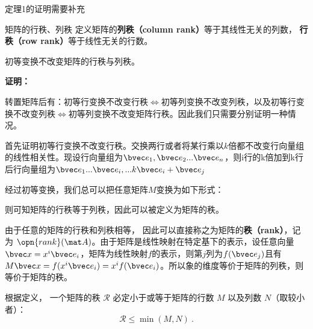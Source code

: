 
\begin{issues}
\issueDraft 定理1的证明需要补充
\end{issues}


\begin{definition}{矩阵的行秩、列秩}
定义矩阵的\textbf{列秩（column rank）}等于其线性无关的列数， \textbf{行秩（row rank）}等于线性无关的行数。
\end{definition}
\begin{theorem}{}
初等变换不改变矩阵的行秩与列秩。
\end{theorem}
\textbf{证明：}

转置矩阵后有：初等行变换不改变行秩$\Leftrightarrow$初等列变换不改变列秩，以及初等行变换不改变列秩$\Leftrightarrow$初等列变换不改变矩阵行秩。因此我们只需要分别证明一种情况。

首先证明初等行变换不改变行秩。交换两行或者将某行乘以$k$倍都不改变行向量组的线性相关性。现设行向量组为$\bvec e_1,\bvec e_2...\bvec e_n$，则i行的k倍加到k行后行向量组为$\bvec e_1...\bvec e_i,...k\bvec e_i+\bvec e_j$


经过初等变换，我们总可以把任意矩阵$M$变换为如下形式：


则可知矩阵的行秩等于列秩，因此可以被定义为矩阵的秩。

\begin{definition}{}
由于任意的矩阵的行秩和列秩相等， 因此可以直接称之为矩阵的\textbf{秩（rank）}，记为 $\opn{rank}(\mat A)$。由于矩阵是线性映射在特定基下的表示，设任意向量$\bvec x=x^i\bvec e_i$，矩阵为线性映射$f$的表示，则第$j$列为$f(\bvec e_j)$且有$M\bvec x=f(x^i\bvec  e_i)=x^if(\bvec e_i)$。所以象的维度等价于矩阵的列秩，则等价于矩阵的秩。
\end{definition}




\begin{theorem}{}
根据定义， 一个矩阵的秩 $\mathcal R$ 必定小于或等于矩阵的行数 $M$ 以及列数 $N$（取较小者）：
\begin{equation}
\mathcal R\leq \min (M, N)~.
\end{equation}
\end{theorem}

